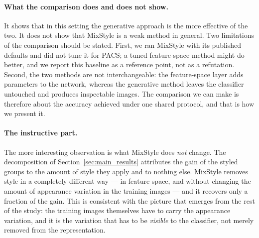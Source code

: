 \paragraph{What the comparison does and does not show.}
It shows that in this setting the generative approach is the more effective
of the two. It does not show that MixStyle is a weak method in general. Two
limitations of the comparison should be stated. First, we ran MixStyle with
its published defaults and did not tune it for PACS; a tuned feature-space
method might do better, and we report this baseline as a reference point,
not as a refutation. Second, the two methods are not interchangeable: the
feature-space layer adds parameters to the network, whereas the generative
method leaves the classifier untouched and produces inspectable images.
The comparison we can make is therefore about the accuracy achieved under
one shared protocol, and that is how we present it.

\paragraph{The instructive part.}
The more interesting observation is what MixStyle does \emph{not} change.
The decomposition of Section~\ref{sec:main_results} attributes the gain of
the styled groups to the amount of style they apply and to nothing else.
MixStyle removes style in a completely different way --- in feature space,
and without changing the amount of appearance variation in the training
images --- and it recovers only a fraction of the gain. This is consistent
with the picture that emerges from the rest of the study: the training
images themselves have to carry the appearance variation, and it is the
variation that has to be \emph{visible} to the classifier, not merely
removed from the representation.
